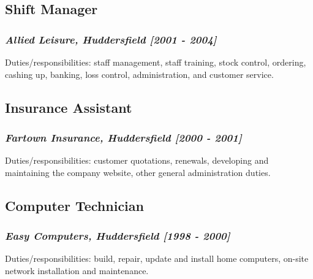 \documentclass{article}
\begin{document}
\subsection*{Shift Manager}
\label{sec-3.3}

\subsubsection*{\emph{Allied Leisure, Huddersfield [2001 - 2004]}}
\label{sec-3.3.1}

Duties/responsibilities: staff management, staff training, stock control, ordering, cashing up, banking, loss control, administration, and customer service.
\subsection*{Insurance Assistant}
\label{sec-3.4}

\subsubsection*{\emph{Fartown Insurance, Huddersfield [2000 - 2001]}}
\label{sec-3.4.1}

Duties/responsibilities: customer quotations, renewals, developing and maintaining the company website, other general administration duties.
\subsection*{Computer Technician}
\label{sec-3.5}

\subsubsection*{\emph{Easy Computers, Huddersfield [1998 - 2000]}}
\label{sec-3.5.1}

Duties/responsibilities: build, repair, update and install home computers, on-site network installation and maintenance.
\end{document}
